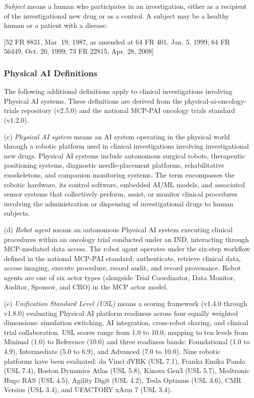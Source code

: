 \documentclass[11pt]{article}
\begin{document}
\textit{Subject} means a human who participates in an investigation, either as a recipient of the investigational new drug or as a control. A subject may be a healthy human or a patient with a disease.

[52 FR 8831, Mar. 19, 1987, as amended at 64 FR 401, Jan. 5, 1999; 64 FR 56449, Oct. 20, 1999; 73 FR 22815, Apr. 28, 2008]

\subsubsection{Physical AI Definitions}

The following additional definitions apply to clinical investigations involving Physical AI systems. These definitions are derived from the physical-ai-oncology-trials repository (v2.5.0) and the national MCP-PAI oncology trials standard (v1.2.0).

(c) \textit{Physical AI system} means an AI system operating in the physical world through a robotic platform used in clinical investigations involving investigational new drugs. Physical AI systems include autonomous surgical robots, therapeutic positioning systems, diagnostic needle-placement platforms, rehabilitative exoskeletons, and companion monitoring systems. The term encompasses the robotic hardware, its control software, embedded AI/ML models, and associated sensor systems that collectively perform, assist, or monitor clinical procedures involving the administration or dispensing of investigational drugs to human subjects.

(d) \textit{Robot agent} means an autonomous Physical AI system executing clinical procedures within an oncology trial conducted under an IND, interacting through MCP-mediated data access. The robot agent operates under the six-step workflow defined in the national MCP-PAI standard: authenticate, retrieve clinical data, access imaging, execute procedure, record audit, and record provenance. Robot agents are one of six actor types (alongside Trial Coordinator, Data Monitor, Auditor, Sponsor, and CRO) in the MCP actor model.

(e) \textit{Unification Standard Level (USL)} means a scoring framework (v1.4.0 through v1.8.0) evaluating Physical AI platform readiness across four equally weighted dimensions: simulation switching, AI integration, cross-robot sharing, and clinical trial collaboration. USL scores range from 1.0 to 10.0, mapping to ten levels from Minimal (1.0) to Reference (10.0) and three readiness bands: Foundational (1.0 to 4.9), Intermediate (5.0 to 6.9), and Advanced (7.0 to 10.0). Nine robotic platforms have been evaluated: da Vinci dVRK (USL 7.1), Franka Emika Panda (USL 7.4), Boston Dynamics Atlas (USL 5.8), Kinova Gen3 (USL 5.7), Medtronic Hugo RAS (USL 4.5), Agility Digit (USL 4.2), Tesla Optimus (USL 3.6), CMR Versius (USL 3.4), and UFACTORY xArm 7 (USL 3.4).
\end{document}
